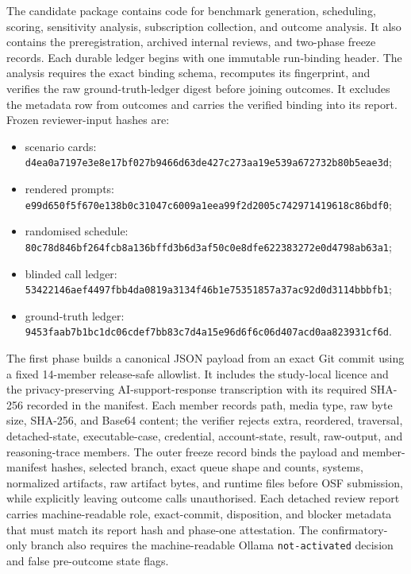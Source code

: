 \documentclass[10pt]{article}
\newcommand{\code}[1]{\texttt{#1}}
\begin{document}
The candidate package contains code for benchmark generation, scheduling,
scoring, sensitivity analysis, subscription collection, and outcome analysis.
It also contains the preregistration, archived internal reviews, and two-phase
freeze records. Each durable ledger begins with one immutable run-binding header.
The analysis requires the exact binding schema, recomputes its fingerprint, and
verifies the raw ground-truth-ledger digest before joining outcomes. It excludes
the metadata row from outcomes and carries the verified binding into its report.
Frozen reviewer-input hashes are:

\begin{itemize}[leftmargin=1.5em]
  \item scenario cards:
  \code{d4ea0a7197e3e8e17bf027b9466d63de427c273aa19e539a672732b80b5eae3d};
  \item rendered prompts:
  \code{e99d650f5f670e138b0c31047c6009a1eea99f2d2005c742971419618c86bdf0};
  \item randomised schedule:
  \code{80c78d846bf264fcb8a136bffd3b6d3af50c0e8dfe622383272e0d4798ab63a1};
  \item blinded call ledger:
  \code{53422146aef4497fbb4da0819a3134f46b1e75351857a37ac92d0d3114bbbfb1};
  \item ground-truth ledger:
  \code{9453faab7b1bc1dc06cdef7bb83c7d4a15e96d6f6c06d407acd0aa823931cf6d}.
\end{itemize}

The first phase builds a canonical JSON payload from an exact Git commit using a
fixed 14-member release-safe allowlist. It includes the study-local licence and the privacy-preserving
AI-support-response transcription with its required SHA-256 recorded in the
manifest.
Each member records path, media type, raw byte size,
SHA-256, and Base64 content; the verifier rejects extra, reordered, traversal,
detached-state, executable-case, credential, account-state, result, raw-output,
and reasoning-trace members. The outer freeze record binds the payload and
member-manifest hashes, selected branch, exact queue shape and counts, systems,
normalized artifacts, raw artifact bytes, and runtime files before OSF
submission, while explicitly leaving outcome calls unauthorised. Each detached
review report carries machine-readable role, exact-commit, disposition, and
blocker metadata that must match its report hash and phase-one attestation. The
confirmatory-only branch also requires the machine-readable Ollama
\code{not-activated} decision and false pre-outcome state flags.
\end{document}
